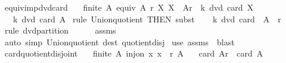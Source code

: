 \begin{isabellebody}
\ equiv{\isacharunderscore}{\kern0pt}imp{\isacharunderscore}{\kern0pt}dvd{\isacharunderscore}{\kern0pt}card{\isacharcolon}{\kern0pt}\isanewline
\ \ \ {\isachardoublequoteopen}finite\ A{\isachardoublequoteclose}\ {\isachardoublequoteopen}equiv\ A\ r{\isachardoublequoteclose}\ {\isachardoublequoteopen}{\isasymAnd}X{\isachardot}{\kern0pt}\ X\ {\isasymin}\ A{\isacharslash}{\kern0pt}{\isacharslash}{\kern0pt}r\ {\isasymLongrightarrow}\ k\ dvd\ card\ X{\isachardoublequoteclose}\isanewline
\ \ \ {\isachardoublequoteopen}k\ dvd\ card\ A{\isachardoublequoteclose}\isanewline
%
\isadelimproof
%
\endisadelimproof
%
\isatagproof
{}\isamarkupfalse%
\ {\isacharparenleft}{\kern0pt}rule\ Union{\isacharunderscore}{\kern0pt}quotient\ {\isacharbrackleft}{\kern0pt}THEN\ subst{\isacharbrackright}{\kern0pt}{\isacharparenright}{\kern0pt}\isanewline
\ \ \isamarkupfalse%
\ {\isachardoublequoteopen}k\ dvd\ card\ {\isacharparenleft}{\kern0pt}{\isasymUnion}\ {\isacharparenleft}{\kern0pt}A\ {\isacharslash}{\kern0pt}{\isacharslash}{\kern0pt}\ r{\isacharparenright}{\kern0pt}{\isacharparenright}{\kern0pt}{\isachardoublequoteclose}\isanewline
\ \ \ \ \isamarkupfalse%
\ {\isacharparenleft}{\kern0pt}rule\ dvd{\isacharunderscore}{\kern0pt}partition{\isacharparenright}{\kern0pt}\isanewline
\ \ \ \ \isamarkupfalse%
\ assms\isanewline
\ \ \ \ \isamarkupfalse%
\ {\isacharparenleft}{\kern0pt}auto\ simp{\isacharcolon}{\kern0pt}\ Union{\isacharunderscore}{\kern0pt}quotient\ dest{\isacharcolon}{\kern0pt}\ quotient{\isacharunderscore}{\kern0pt}disj{\isacharparenright}{\kern0pt}\isanewline
{}\isamarkupfalse%
\ {\isacharparenleft}{\kern0pt}use\ assms\ \ blast{\isacharparenright}{\kern0pt}%
\endisatagproof
{\isafoldproof}%
%
\isadelimproof
\isanewline
%
\endisadelimproof
\isanewline
{}\isamarkupfalse%
\ card{\isacharunderscore}{\kern0pt}quotient{\isacharunderscore}{\kern0pt}disjoint{\isacharcolon}{\kern0pt}\isanewline
\ \ \ {\isachardoublequoteopen}finite\ A{\isachardoublequoteclose}\ {\isachardoublequoteopen}inj{\isacharunderscore}{\kern0pt}on\ {\isacharparenleft}{\kern0pt}{\isasymlambda}x{\isachardot}{\kern0pt}\ {\isacharbraceleft}{\kern0pt}x{\isacharbraceright}{\kern0pt}\ {\isacharslash}{\kern0pt}{\isacharslash}{\kern0pt}\ r{\isacharparenright}{\kern0pt}\ A{\isachardoublequoteclose}\isanewline
\ \ \ {\isachardoublequoteopen}card\ {\isacharparenleft}{\kern0pt}A{\isacharslash}{\kern0pt}{\isacharslash}{\kern0pt}r{\isacharparenright}{\kern0pt}\ {\isacharequal}{\kern0pt}\ card\ A{\isachardoublequoteclose}\isanewline

\end{isabellebody}
